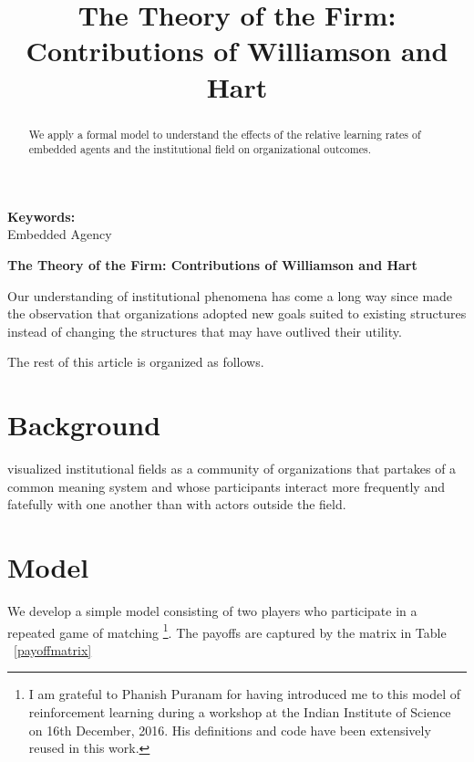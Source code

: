 \documentclass[12pt,letterpaper]{article}
\begin{document}
\title{The Theory of the Firm:\\ Contributions of Williamson and Hart}
\date{}
\maketitle

\begin{abstract} 
\normalsize 
We apply a formal model to understand the effects of the relative learning rates of embedded agents and the institutional field on organizational outcomes. 
\end{abstract}


{\textbf{Keywords:} \\\indent Embedded Agency}

\newpage
\pagestyle{fancy}
\fancyhf{}
\rhead{\thepage}

\begin{center}
\textbf{The Theory of the Firm: Contributions of Williamson and Hart}
\end{center}
Our understanding of  institutional phenomena has come a long way since \cite{Selznick1957} made the observation that organizations adopted new goals suited to existing structures  instead of changing the structures that may have outlived their utility. 

The rest of this article is organized as follows. 

\section{Background}
 \cite{Scott1995} visualized institutional fields as a community of organizations that partakes of a common meaning system and whose participants interact more frequently and fatefully with one another than with actors outside the field. 
 
\section{Model}

We develop a simple model consisting of two players who participate in a repeated game of matching \footnote{I am grateful to Phanish Puranam for having introduced me to this model of reinforcement learning during a workshop at the Indian Institute of Science on 16th December, 2016. His definitions and code have been extensively reused in this work.}. The payoffs are captured by the matrix in Table ~\ref{payoffmatrix}
\end{document}
